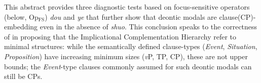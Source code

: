 \documentclass[11pt]{article}
\newcommand{\opfs}{Op\(_{\mathrm{FS}}\)}
\begin{document}
This abstract provides three diagnostic tests based on focus-sensitive operators (below, \opfs{}) \emph{dou} and \emph{ye} that further show that deontic modals are clause(CP)-embedding even in the absence of \emph{shuo}.
This conclusion speaks to the correctness of \citet{wurmbrandImplicationalUniversalComplementation2020} in proposing that the Implicational Complementation Hierarchy refer to minimal structures: while the semantically defined clause-types (\emph{Event}, \emph{Situation}, \emph{Proposition}) have increasing minimum sizes (\emph{v}P, TP, CP), these are not upper bounds; the \emph{Event}-type clauses commonly assumed for such deontic modals can still be CPs.

\end{document}
